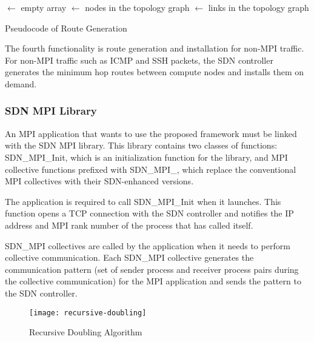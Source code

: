 \begin{algorithm}

    \Routes $\gets$ empty array\;
    \Nodes $\gets$ nodes in the topology graph\;
    \Links $\gets$ links in the topology graph\;


    \caption{Pseudocode of Route Generation}%
    \label{lst:code-generate-route}
\end{algorithm}

The fourth functionality is route generation and installation for
non-MPI traffic. For non-MPI traffic such as ICMP and SSH packets, the
SDN controller generates the minimum hop routes between compute nodes
and installs them on demand.

\subsubsection{SDN MPI Library}

An MPI application that wants to use the proposed framework must be linked
with the SDN MPI library. This library contains two classes of functions:
SDN\_MPI\_Init, which is an initialization function for the library, and
MPI collective functions prefixed with SDN\_MPI\_, which replace the
conventional MPI collectives with their SDN-enhanced versions.

The application is required to call SDN\_MPI\_Init when it launches. This
function opens a TCP connection with the SDN controller and notifies the IP
address and MPI rank number of the process that has called itself.

SDN\_MPI collectives are called by the application when it needs to perform
collective communication. Each SDN\_MPI collective generates the communication
pattern (set of sender process and receiver process pairs during the
collective communication) for the MPI application and sends the pattern to the
SDN controller.

\begin{figure}
    \centering
    \texttt{[image: recursive-doubling]}
    \caption{Recursive Doubling Algorithm}%
    \label{fig:recursive-doubling}
\end{figure}

